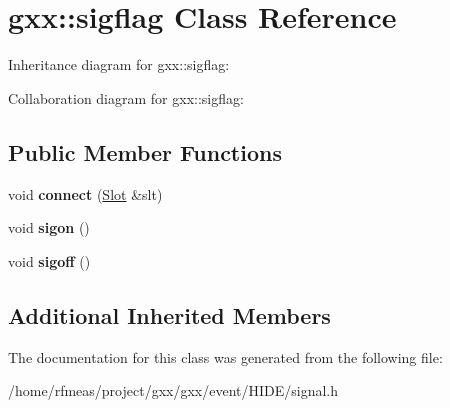 \hypertarget{classgxx_1_1sigflag}{}\section{gxx\+:\+:sigflag Class Reference}
\label{classgxx_1_1sigflag}


Inheritance diagram for gxx\+:\+:sigflag\+:


Collaboration diagram for gxx\+:\+:sigflag\+:
\subsection*{Public Member Functions}
\begin{DoxyCompactItemize}
\item 
void {\bfseries connect} (\hyperlink{classgxx_1_1basic__slot}{Slot} \&slt)\hypertarget{classgxx_1_1sigflag_adfea426da5c1bb7f16814d32f1aa313c}{}\label{classgxx_1_1sigflag_adfea426da5c1bb7f16814d32f1aa313c}

\item 
void {\bfseries sigon} ()\hypertarget{classgxx_1_1sigflag_a161b6f4f752248483ba2be9e1f94d905}{}\label{classgxx_1_1sigflag_a161b6f4f752248483ba2be9e1f94d905}

\item 
void {\bfseries sigoff} ()\hypertarget{classgxx_1_1sigflag_a284388c1bb43a3a7e184fbc64552f268}{}\label{classgxx_1_1sigflag_a284388c1bb43a3a7e184fbc64552f268}

\end{DoxyCompactItemize}
\subsection*{Additional Inherited Members}


The documentation for this class was generated from the following file\+:\begin{DoxyCompactItemize}
\item 
/home/rfmeas/project/gxx/gxx/event/\+H\+I\+D\+E/signal.\+h\end{DoxyCompactItemize}
